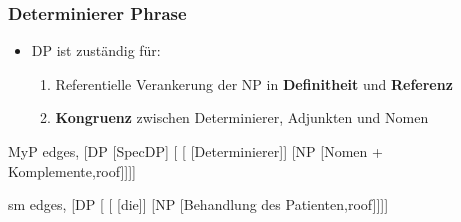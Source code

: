 \begin{frame}
\frametitle{Determinierer Phrase}

	\begin{itemize}
		\item DP ist zuständig für:
		\begin{enumerate}
			\item Referentielle Verankerung der NP in \textbf{Definitheit} und \textbf{Referenz}
			\item \textbf{Kongruenz} zwischen Determinierer, Adjunkten und Nomen
		\end{enumerate}				
	\end{itemize}



\begin{minipage}[b]{0.6\textwidth}
	\centering
	\footnotesize{
		\begin{forest}
		MyP edges,
		[DP [SpecDP]
			[ 	[ [Determinierer]]
						[NP [Nomen + Komplemente,roof]]]]
		\end{forest}
		}
\end{minipage}  
\pause            
\begin{minipage}[b]{0.35\textwidth}
	\centering
	\footnotesize{
		\begin{forest}
		sm edges,
		[DP [ 	[ [die]]
						[NP [Behandlung des Patienten,roof]]]]
		\end{forest}
		}
\end{minipage}  

\end{frame}



